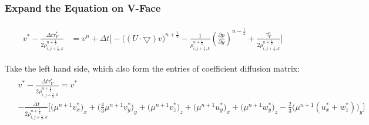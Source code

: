 \documentclass{article}
\numberwithin{equation}{subsection}
\begin{document}
\subsubsection{Expand the Equation on V-Face}
\begin{align}
\begin{split}
v^{*} - \frac{\Delta t  \tau_Y^{*}}{2\rho^{n+\frac{1}{2}}_{i,j+\frac{1}{2},k}} &= v^n + \Delta t \Bigg[ -\Big( (U \cdot \bigtriangledown) v\Big)^{n+\frac{1}{2}}
-\frac{1}{\rho^{n+\frac{1}{2}}_{i,j+\frac{1}{2},k}}  (\frac{\partial p}{\partial y})^{n-\frac{1}{2}} + \frac{ \tau_Y^{n}}{2\rho^{n+\frac{1}{2}}_{i,j+\frac{1}{2},k}} \Bigg]
\end{split}
\end{align}

Take the left hand side, which also form the entries of coefficient diffusion matrix:
\begin{align}
\begin{split}
& v^{*} - \frac{\Delta t  \tau_Y^{*}}{2\rho^{n+\frac{1}{2}}_{i,j+\frac{1}{2},k}} = v^{*} \\
& -\frac{\Delta t}{2\rho^{n+\frac{1}{2}}_{i,j+\frac{1}{2},k}} \Bigg[ \Big(\mu^{n+1} v^*_x\Big)_x + \Big(\frac{4}{3}\mu^{n+1} v^*_y \Big)_y  + \Big(\mu^{n+1} v^*_z\Big)_z + \Big(\mu^{n+1} u^*_y \Big)_x + \Big(\mu^{n+1} w^*_y\Big)_z - \frac{2}{3}\Big(\mu^{n+1}(u^*_x + w^*_z)\Big)_y \Bigg]
\end{split}
\end{align}
\end{document}
